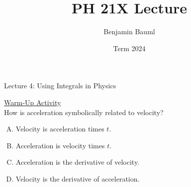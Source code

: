 \documentclass[]{article}
\title{PH 21X Lecture \Week}
\author{Benjamin Bauml}
\date{Term 2024}
\begin{document}
\begin{TeacherMargin}

\end{TeacherMargin}
\begin{PresentSpace}
\begin{center}
	\huge Lecture 4: Using Integrals in Physics
\end{center}
\vspace{1cm}
\underline{Warm-Up Activity} \\
How is acceleration symbolically related to velocity?
\begin{enumerate}[(A)]
	\item Velocity is acceleration times $t$.
	\item Acceleration is velocity times $t$.
	\item Acceleration is the derivative of velocity.
	\item Velocity is the derivative of acceleration.
\end{enumerate}
\end{PresentSpace}
\newpage
\begin{TeacherMargin}

\end{TeacherMargin}
\end{document}
